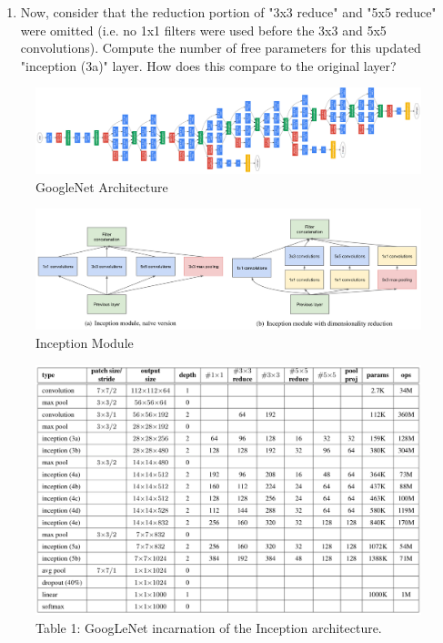 \documentclass[a4paper]{article}
\begin{document}
\begin{enumerate}
\begin{enumerate}[resume]
			\item Now, consider that the reduction portion of "3x3 reduce" and "5x5 reduce" were omitted (i.e. no 1x1 filters were used before the 3x3 and 5x5 convolutions). Compute the number of free parameters for this updated "inception (3a)" layer. How does this compare to the original layer?
		\end{enumerate}
		
		\begin{figure}[h]
				\centering
				\includegraphics[scale=0.15]{images/googlenet.png}
				\caption{GoogleNet Architecture}
				\label{fig:googlenet}
			\end{figure}
			
			\begin{figure}[h]
				\centering
				\includegraphics[scale=0.30]{images/inception.png}
				\caption{Inception Module}
				\label{fig:inception}
			\end{figure}
			
			\begin{figure}[!]
				\centering
				\includegraphics[scale=0.25]{images/table.png}
				\caption{Table 1: GoogLeNet incarnation of the Inception architecture.}
				\label{fig:table}
			\end{figure}
		

\end{enumerate}
\end{document}
